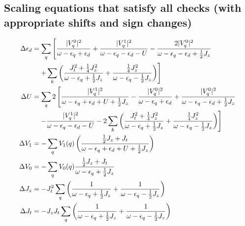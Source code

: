 \documentclass[14pt]{extarticle}
\numberwithin{equation}{section}
\begin{document}
\subsection{Scaling equations that satisfy all checks (with appropriate shifts and sign changes)}
\begin{align*}
\Delta \epsilon_d &= \sum_q \left[\frac{|V_q^0|^2}{\omega - \epsilon_q + \epsilon_d } + \frac{|V_q^1|^2}{\omega - \epsilon_q - \epsilon_d - U} - \frac{2|V_q^0|^2}{\omega - \epsilon_q - \epsilon_d + \frac{1}{2} J_z} \right.\\
&\quad\left.+ \sum_{k}\left({\frac{J_t^2 + \frac{1}{4}J_z^2}{\omega - \epsilon_q + \frac{1}{2} J_z} + \frac{\frac{1}{4}J_z^2}{\omega - \epsilon_q - \frac{1}{2} J_z}}\right)\right]\\
\Delta U &= \sum_q 2\left[\frac{|V_q^1|^2}{\omega - \epsilon_q + \epsilon_d + U + \frac{1}{2} J_z} - \frac{|V_q^0|^2}{\omega - \epsilon_q + \epsilon_d} + \frac{|V_q^0|^2}{\omega - \epsilon_q - \epsilon_d + \frac{1}{2} J_z}  \right.\\
&\quad\left.- \frac{|V_q^1|^2}{\omega - \epsilon_q - \epsilon_d - U} - 2\sum_{k}\left({\frac{J_t^2 + \frac{1}{4}J_z^2}{\omega - \epsilon_q + \frac{1}{2} J_z} + \frac{\frac{1}{4}J_z^2}{\omega - \epsilon_q - \frac{1}{2} J_z}}\right)\right]\\
\Delta V_1 &= -\sum_q V_1(q)\left({\frac{\frac{1}{2} J_z + J_t}{\omega - \epsilon_q +\epsilon_d + U + \frac{1}{2} J_z}}\right)\\
\Delta V_0 &= -\sum_q V_0(q)\frac{\frac{1}{2} J_z + J_t}{\omega - \epsilon_q + \frac{1}{2} J_z}\\
\Delta J_z &= -J_t^2 \sum_q \left({\frac{1}{\omega - \epsilon_q  + \frac{1}{2}  J_z} + \frac{1}{\omega - \epsilon_q  - \frac{1}{2} J_z}}\right)\\
\Delta J_t &= - J_z J_t \sum_q \left({\frac{1}{\omega - \epsilon_q  + \frac{1}{2} J_z} + \frac{1}{\omega - \epsilon_q  - \frac{1}{2} J_z}}\right)
\end{align*}
\end{document}

